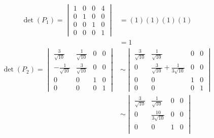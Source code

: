 \documentclass[11pt]{article}
\begin{document}
\begin{enumerate}[label=\textbf{\arabic*.}]
{\begin{enumerate}[label=\textbf{(\alph*)}]
{\begin{align*}
                        \det(P_1)=
                        \begin{vmatrix}
                            1 & 0 & 0 & 4 \\
                            0 & 1 & 0 & 0 \\
                            0 & 0 & 1 & 0 \\
                            0 & 0 & 0 & 1
                        \end{vmatrix} & =(1)(1)(1)(1) \\
                                                  & =1
                    \end{align*}
                    \begin{align*}
                        \det(P_2)=
                        \begin{vmatrix}
                            \frac{3}{\sqrt{10}}  & \frac{1}{\sqrt{10}} & 0 & 0 \\
                            -\frac{1}{\sqrt{10}} & \frac{3}{\sqrt{10}} & 0 & 0 \\
                            0                    & 0                   & 1 & 0 \\
                            0                    & 0                   & 0 & 1
                        \end{vmatrix} & \sim
                        \begin{vmatrix}
                            \frac{3}{\sqrt{10}} & \frac{1}{\sqrt{10}}                      & 0 & 0 \\
                            0                   & \frac{3}{\sqrt{10}}+\frac{1}{3\sqrt{10}} & 0 & 0 \\
                            0                   & 0                                        & 1 & 0 \\
                            0                   & 0                                        & 0 & 1
                        \end{vmatrix}                                                                      \\
                                                  & \sim
                        \begin{vmatrix}
                            \frac{3}{\sqrt{10}} & \frac{1}{\sqrt{10}}   & 0 & 0 \\
                            0                   & \frac{10}{3\sqrt{10}} & 0 & 0 \\
                            0                   & 0                     & 1 & 0 \\

\end{vmatrix}
\end{align*}}
\end{enumerate}}
\end{enumerate}
\end{document}
